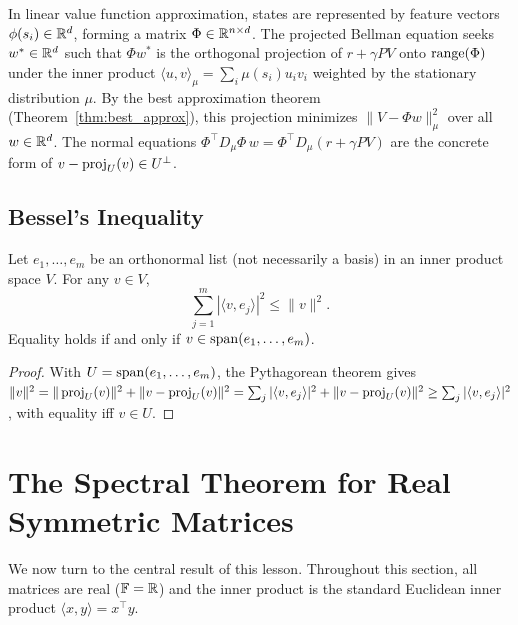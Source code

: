 \documentclass[11pt,a4paper]{article}
\begin{document}
\begin{rlconnection}[title={Least Squares and Linear Value Function Approximation}]
In linear value function approximation, states are represented by feature
vectors $\phi(s_i) \in \mathbb{R}^d$, forming a matrix $\Phi \in \mathbb{R}^{n \times d}$.
The projected Bellman equation seeks $w^* \in \mathbb{R}^d$ such that
$\Phi w^*$ is the orthogonal projection of $r + \gamma P V$ onto
$\operatorname{range}(\Phi)$ under the inner product
$\langle u, v \rangle_\mu = \sum_i \mu(s_i) u_i v_i$ weighted by the
stationary distribution $\mu$.  By the best approximation theorem
(Theorem~\ref{thm:best_approx}), this projection minimizes
$\|V - \Phi w\|_\mu^2$ over all $w \in \mathbb{R}^d$.  The normal equations
$\Phi^\top D_\mu \Phi\, w = \Phi^\top D_\mu (r + \gamma P V)$ are the
concrete form of $v - \operatorname{proj}_U(v) \in U^\perp$.
\end{rlconnection}

\subsection{Bessel's Inequality}

\begin{theorem}
\label{thm:bessel}
Let $e_1, \ldots, e_m$ be an orthonormal list (not necessarily a basis)
in an inner product space $V$.  For any $v \in V$,
\[
  \sum_{j=1}^{m} |\langle v, e_j \rangle|^2 \leq \|v\|^2.
\]
Equality holds if and only if $v \in \operatorname{span}(e_1, \ldots, e_m)$.
\end{theorem}

\begin{proof}
With $U = \operatorname{span}(e_1, \ldots, e_m)$, the Pythagorean theorem gives
$\|v\|^2 = \|\operatorname{proj}_U(v)\|^2 + \|v - \operatorname{proj}_U(v)\|^2
= \sum_j |\langle v, e_j \rangle|^2 + \|v - \operatorname{proj}_U(v)\|^2
\geq \sum_j |\langle v, e_j \rangle|^2$,
with equality iff $v \in U$.
\end{proof}

\section{The Spectral Theorem for Real Symmetric Matrices}
\label{sec:spectral}

We now turn to the central result of this lesson.  Throughout this
section, all matrices are real ($\mathbb{F} = \mathbb{R}$) and the inner product is
the standard Euclidean inner product $\langle x, y \rangle = x^\top y$.
\end{document}
